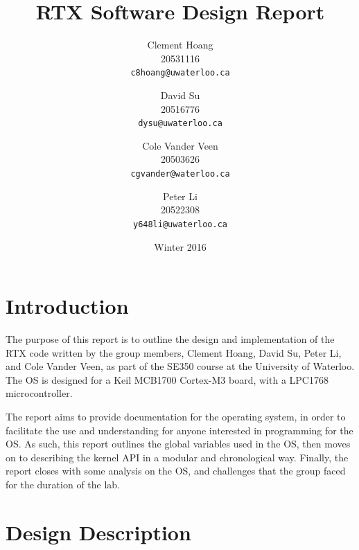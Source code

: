 \documentclass[12pt]{report}
\begin{document}
\title{RTX Software Design Report}

\author{
    Clement Hoang\\
		20531116\\
    \texttt{c8hoang@uwaterloo.ca}
    \and
    David Su\\
		20516776\\
    \texttt{dysu@uwaterloo.ca}
    \and
    Cole Vander Veen\\
		20503626\\
    \texttt{cgvander@waterloo.ca}
    \and
    Peter Li\\
		20522308\\
    \texttt{y648li@uwaterloo.ca}
}

\date{Winter 2016}

\maketitle


\tableofcontents
\listofalgorithms
\listoffigures

\chapter{Introduction}

The purpose of this report is to outline the design and implementation of the RTX code written by the group members, Clement Hoang, David Su, Peter Li, and Cole Vander Veen, as part of the SE350 course at the University of Waterloo. The OS is designed for a Keil MCB1700 Cortex-M3 board, with a LPC1768 microcontroller.

The report aims to provide documentation for the operating system, in order to facilitate the use and understanding for anyone interested in programming for the OS. As such, this report outlines the global variables used in the OS, then moves on to describing the kernel API in a modular and chronological way. Finally, the report closes with some analysis on the OS, and challenges that the group faced for the duration of the lab.

\chapter{Design Description}
\end{document}
